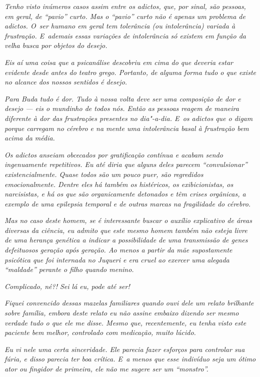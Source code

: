 \emph{Tenho visto inúmeros casos assim entre os adictos, que, por sinal,
são pessoas, em geral, de ``pavio'' curto. Mas o ``pavio'' curto não é
apenas um problema de adictos. O~ser humano em geral tem tolerância (ou
intolerância) variada à frustração. E~ademais essas variações de
intolerância só existem em função da velha busca por objetos do
desejo.}~

\emph{Eis aí uma coisa que a psicanálise descobriu em cima do que
deveria estar evidente desde antes do teatro grego. Portanto, de alguma
forma tudo o que existe no alcance dos nossos sentidos é desejo.}~

\emph{Para Buda tudo é dor. Tudo à nossa volta deve ser uma composição
de dor e desejo --- eis o mundinho de todos nós. Então as pessoas reagem
de maneira diferente à dor das frustrações presentes no dia"-a-dia. E~os
adictos que o digam porque carregam no cérebro e na mente uma
intolerância basal à frustração bem acima da média.}~

\emph{Os adictos anseiam obcecados por gratificação contínua e acabam
sendo ingenuamente repetitivos. Eu até diria que alguns deles parecem
``convulsionar'' existencialmente. Quase todos são um pouco puer, são
regredidos emocionalmente. Dentre eles há também os histéricos, os
exibicionistas, os narcisistas, e há os que são organicamente detonados
e têm crises orgânicas, a exemplo de uma epilepsia temporal e de outras
marcas na fragilidade do cérebro.}~

\emph{Mas no caso deste homem, se é interessante buscar o auxílio
explicativo de áreas diversas da ciência, eu admito que este mesmo homem
também não esteja livre de uma herança genética a indicar a
possibilidade de uma transmissão de genes defeituosos geração após
geração. Ao menos a partir da mãe supostamente psicótica que foi
internada no Juqueri e era cruel ao exercer uma alegada ``maldade''
perante o filho quando menino.}~

\emph{Complicado, né?! Sei lá eu, pode até ser!}

\emph{Fiquei convencido dessas mazelas familiares quando ouvi dele um
relato brilhante sobre família, embora deste relato eu não assine
embaixo dizendo ser mesmo verdade tudo o que ele me disse. Mesmo que,
recentemente, eu tenha visto este paciente bem melhor, controlado com
medicação, muito lúcido.}~

\emph{Eu vi nele uma certa sinceridade. Ele parecia fazer esforços para
controlar sua fúria, e disso parecia ter boa crítica. E~a menos que esse
indivíduo seja um ótimo ator ou fingidor de primeira, ele não me sugere
ser um ``monstro''.}~

